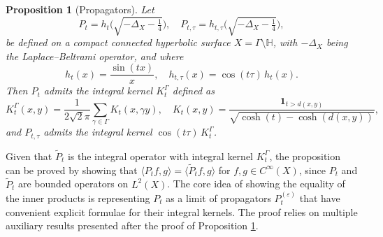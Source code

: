 \documentclass[11pt,twoside,reqno]{amsart} \usepackage{a4wide} \usepackage[T1]{fontenc} \usepackage[utf8]{inputenc} \usepackage{soul}  \usepackage{amsmath} \usepackage{amsfonts} \usepackage{amssymb} \usepackage{mathtools} \usepackage{amsthm} \usepackage{xcolor} \usepackage{graphicx} \usepackage{hyperref} \usepackage{standalone} \usepackage{esint} \usepackage{comment} \usepackage[left=2.3cm,top=3cm,right=2.3cm]{geometry} \usepackage{bm} \usepackage{svg} \usepackage{float} \numberwithin{equation}{section} \theoremstyle{plain} \newtheorem{thm}{Theorem}[section] \newtheorem{theorem}[thm]{Theorem} \newtheorem*{theorem*}{Theorem}\newtheorem{conj}[thm]{Conjecture} \newtheorem{lemma}[thm]{Lemma} \newtheorem{prop}[thm]{Proposition} \newtheorem{proposition}[thm]{Proposition} \newtheorem{cor}[thm]{Corollary} \newtheorem{question}[thm]{Question} \newtheorem{corollary}[thm]{Corollary} \newtheorem{assumption}[thm]{Assumption} \theoremstyle{definition} \newtheorem{defn}[thm]{Definition} \newtheorem{choice}[thm]{Choice} \newtheorem{definition}[thm]{Definition} \newtheorem{ex}[thm]{Example} \newtheorem{notation}[thm]{Notation} \newtheorem*{ack}{Acknowledgements} \theoremstyle{remark} \newtheorem{remark}[thm]{Remark} \newtheorem{bigremark}[thm]{Remark} \usepackage{xcolor} \newcommand{\red}[1]{ {\color{Red}#1} } \newcommand{\blue}[1]{ {\color{Blue}#1} } \author{Kai Hippi} \address{Aalto University, Espoo, Finland} \email{kai.hippi@aalto.fi}
\begin{document}
\begin{proposition}[Propagators]
\label{Prp: Propagators}
Let
\[
P_t = h_t\Big( \sqrt{-\Delta_X - \tfrac14} \Big), \quad
P_{t,\tau} = h_{t,\tau}\Big( \sqrt{-\Delta_X - \tfrac14} \Big),
\]
be defined on a compact connected hyperbolic surface $X = \Gamma \setminus \mathbb{H}$, with $-\Delta_{X}$ being the Laplace–Beltrami operator, and where
\[
h_t(x) = \frac{\sin(tx)}{x}, \quad h_{t,\tau}(x) = \cos(t\tau) \, h_t(x).
\]
Then $P_t$ admits the integral kernel $K_{t}^{\Gamma}$ defined as
\[
K_t^\Gamma(x,y) = \frac{1}{2\sqrt{2} \pi} \sum_{\gamma \in \Gamma} K_t(x, \gamma y), \quad
K_t(x,y) = \frac{\mathbf{1}_{t > d(x,y)}}{\sqrt{\cosh(t) - \cosh(d(x,y))}},
\]
and $P_{t,\tau}$ admits the integral kernel $\cos(t\tau) \, K_t^\Gamma$.
\end{proposition}

Given that $\tilde{P}_{t}$ is the integral operator with integral kernel $K_{t}^{\Gamma}$, the proposition can be proved by showing that $\langle P_{t} f, g \rangle = \langle \tilde{P}_{t} f, g \rangle$ for $f ,g \in C^{\infty}( X )$, since $P_{t}$ and $\tilde{P}_{t}$ are bounded operators on $L^{2}( X )$. The core idea of showing the equality of the inner products is representing $P_{t}$ as a limit of propagators $P_{t}^{(\varepsilon)}$ that have convenient explicit formulae for their integral kernels. The proof relies on multiple auxiliary results presented after the proof of Proposition \ref{Prp: Propagators}.
\end{document}
